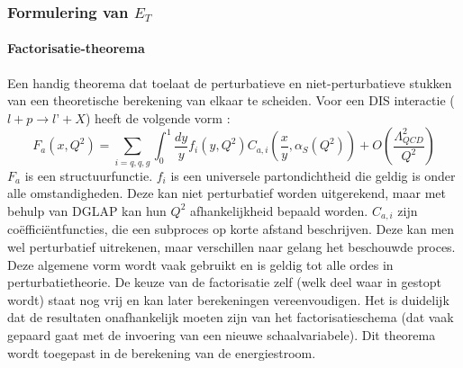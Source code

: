 \documentclass[a4paper,11pt]{article}
\numberwithin{equation}{section} %
\begin{document}
    \subsubsection{Formulering van $E_T$}
      \paragraph{Factorisatie-theorema}
Een handig theorema dat toelaat de perturbatieve en niet-perturbatieve stukken van een  theoretische berekening van elkaar te scheiden.
Voor een DIS interactie ($l+p\rightarrow l’+X$) heeft de volgende vorm \cite{Martin}: 
\begin{equation}
F_a(x, Q^2) = \sum_{i=q,q,g} \int_0^1 \frac{dy}{y} f_i(y, Q^2) C_{a,i} \left( \frac{x}{y},\alpha_S(Q^2) \right) + O \left( \frac{\Lambda_{QCD}^2}{Q^2} \right) 
\end{equation}
$F_a$ is een structuurfunctie.
$f_i$ is een universele partondichtheid die geldig is onder alle omstandigheden.
Deze kan niet perturbatief worden uitgerekend, maar met behulp van DGLAP kan hun $Q^2$ afhankelijkheid bepaald worden.
$C_{a,i}$ zijn coëfficiëntfuncties, die een subproces op korte afstand beschrijven.
Deze kan men wel perturbatief uitrekenen, maar verschillen naar gelang het beschouwde proces.
Deze algemene vorm wordt vaak gebruikt en is geldig tot alle ordes in perturbatietheorie.
De keuze van de factorisatie zelf (welk deel waar in gestopt wordt) staat nog vrij en kan later berekeningen vereenvoudigen.
Het is duidelijk dat de resultaten onafhankelijk moeten zijn van het factorisatieschema (dat vaak gepaard gaat met de invoering van een nieuwe schaalvariabele).
Dit theorema wordt toegepast in de berekening van de energiestroom.
\end{document}
